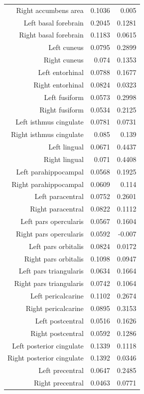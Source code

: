 \documentclass{article}
\begin{document}
\begin{table}[h]
\begin{centering}
\begin{tabular}{|r|r|r|}
		  Right accumbens area & 0.1036 & 0.005 \\
		  Left basal forebrain & 0.2045 & 0.1281 \\
		  Right basal forebrain & 0.1183 & 0.0615 \\
		  Left cuneus & 0.0795 & 0.2899 \\
		  Right cuneus & 0.074 & 0.1353 \\
		  Left entorhinal & 0.0788 & 0.1677 \\
		  Right entorhinal & 0.0824 & 0.0323 \\
		  Left fusiform & 0.0573 & 0.2998 \\
		  Right fusiform & 0.0534 & 0.2125 \\
		  Left isthmus cingulate & 0.0781 & 0.0731 \\
		  Right isthmus cingulate & 0.085 & 0.139 \\
		  Left lingual & 0.0671 & 0.4437 \\
		  Right lingual & 0.071 & 0.4408 \\
		  Left parahippocampal & 0.0568 & 0.1925 \\
		  Right parahippocampal & 0.0609 & 0.114 \\
		  Left paracentral & 0.0752 & 0.2601 \\
		  Right paracentral & 0.0822 & 0.1112 \\
		  Left pars opercularis & 0.0567 & 0.1604 \\
		  Right pars opercularis & 0.0592 & -0.007 \\
		  Left pars orbitalis & 0.0824 & 0.0172 \\
		  Right pars orbitalis & 0.1098 & 0.0947 \\
		  Left pars triangularis & 0.0634 & 0.1664 \\
		  Right pars triangularis & 0.0742 & 0.1064 \\
		  Left pericalcarine & 0.1102 & 0.2674 \\
		  Right pericalcarine & 0.0895 & 0.3153 \\
		  Left postcentral & 0.0516 & 0.1626 \\
		  Right postcentral & 0.0592 & 0.1286 \\
		  Left posterior cingulate & 0.1339 & 0.1118 \\
		  Right posterior cingulate & 0.1392 & 0.0346 \\
		  Left precentral & 0.0647 & 0.2485 \\
		  Right precentral & 0.0463 & 0.0771 \\

\end{tabular}
\end{centering}
\end{table}
\end{document}
